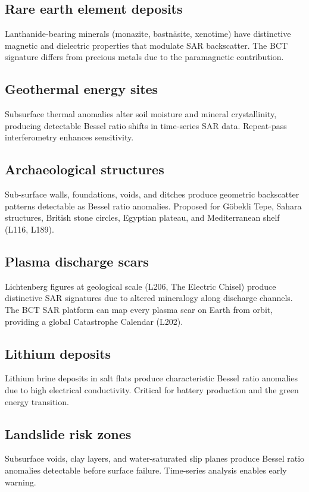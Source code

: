 \documentclass[aps,prl,twocolumn,superscriptaddress]{revtex4-2}
\begin{document}
\subsection{Rare earth element deposits}
Lanthanide-bearing minerals (monazite, bastn\"asite, xenotime) have distinctive magnetic and dielectric properties that modulate SAR backscatter. The BCT signature differs from precious metals due to the paramagnetic contribution.

\subsection{Geothermal energy sites}
Subsurface thermal anomalies alter soil moisture and mineral crystallinity, producing detectable Bessel ratio shifts in time-series SAR data. Repeat-pass interferometry enhances sensitivity.

\subsection{Archaeological structures}
Sub-surface walls, foundations, voids, and ditches produce geometric backscatter patterns detectable as Bessel ratio anomalies. Proposed for G\"obekli Tepe, Sahara structures, British stone circles, Egyptian plateau, and Mediterranean shelf (L116, L189).

\subsection{Plasma discharge scars}
Lichtenberg figures at geological scale (L206, The Electric Chisel) produce distinctive SAR signatures due to altered mineralogy along discharge channels. The BCT SAR platform can map every plasma scar on Earth from orbit, providing a global Catastrophe Calendar (L202).

\subsection{Lithium deposits}
Lithium brine deposits in salt flats produce characteristic Bessel ratio anomalies due to high electrical conductivity. Critical for battery production and the green energy transition.

\subsection{Landslide risk zones}
Subsurface voids, clay layers, and water-saturated slip planes produce Bessel ratio anomalies detectable before surface failure. Time-series analysis enables early warning.
\end{document}
